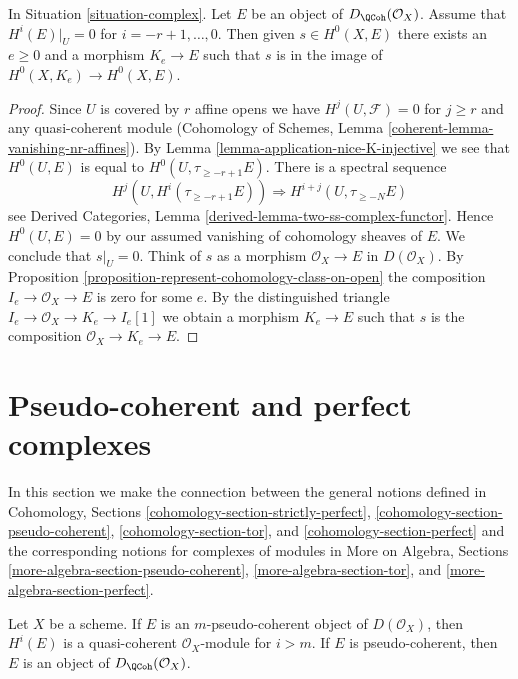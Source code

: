 \begin{lemma}
\label{lemma-represent-cohomology-class-on-closed}
In Situation \ref{situation-complex}. Let $E$ be an object of
$D_\QCoh(\mathcal{O}_X)$.
Assume that $H^i(E)|_U = 0$ for $i = - r + 1, \ldots, 0$.
Then given $s \in H^0(X, E)$ there exists an $e \geq 0$ and
a morphism $K_e \to E$ such that $s$ is in the image of
$H^0(X, K_e) \to H^0(X, E)$.
\end{lemma}

\begin{proof}
Since $U$ is covered by $r$ affine opens we have $H^j(U, \mathcal{F}) = 0$
for $j \geq r$ and any quasi-coherent module
(Cohomology of Schemes, Lemma \ref{coherent-lemma-vanishing-nr-affines}).
By Lemma \ref{lemma-application-nice-K-injective} we see that $H^0(U, E)$
is equal to $H^0(U, \tau_{\geq -r + 1}E)$. There is
a spectral sequence
$$
H^j(U, H^i(\tau_{\geq -r + 1}E)) \Rightarrow H^{i + j}(U, \tau_{\geq -N}E)
$$
see Derived Categories, Lemma \ref{derived-lemma-two-ss-complex-functor}.
Hence $H^0(U, E) = 0$ by our assumed vanishing of cohomology sheaves of $E$.
We conclude that $s|_U = 0$.
Think of $s$ as a morphism $\mathcal{O}_X \to E$ in $D(\mathcal{O}_X)$.
By Proposition \ref{proposition-represent-cohomology-class-on-open}
the composition $I_e \to \mathcal{O}_X \to E$ is zero for some $e$.
By the distinguished triangle $I_e \to \mathcal{O}_X \to K_e \to I_e[1]$
we obtain a morphism $K_e \to E$ such that $s$ is the composition
$\mathcal{O}_X \to K_e \to E$.
\end{proof}


\section{Pseudo-coherent and perfect complexes}
\label{section-spell-out}

\noindent
In this section we make the connection between the general
notions defined in
Cohomology, Sections \ref{cohomology-section-strictly-perfect},
\ref{cohomology-section-pseudo-coherent},
\ref{cohomology-section-tor}, and
\ref{cohomology-section-perfect}
and the corresponding notions for complexes of modules in
More on Algebra, Sections
\ref{more-algebra-section-pseudo-coherent},
\ref{more-algebra-section-tor}, and
\ref{more-algebra-section-perfect}.

\begin{lemma}
\label{lemma-pseudo-coherent}
Let $X$ be a scheme. If $E$ is an $m$-pseudo-coherent
object of $D(\mathcal{O}_X)$, then $H^i(E)$ is a quasi-coherent
$\mathcal{O}_X$-module for $i > m$.
If $E$ is pseudo-coherent, then $E$ is an object of
$D_\QCoh(\mathcal{O}_X)$.
\end{lemma}

